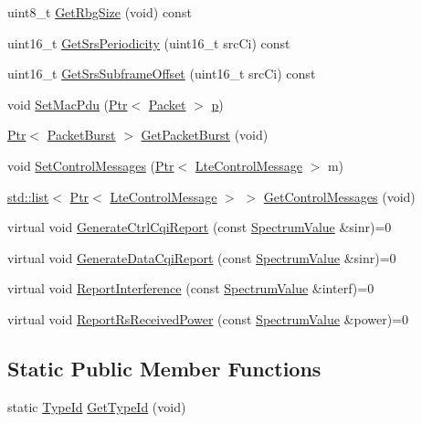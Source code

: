 \begin{DoxyCompactItemize}
uint8\+\_\+t \hyperlink{classns3_1_1LtePhy_a0b43cc13670b730fce0b55c8e0db60d9}{Get\+Rbg\+Size} (void) const 
\item 
uint16\+\_\+t \hyperlink{classns3_1_1LtePhy_af761a0bb48001fbc605757f781d5724d}{Get\+Srs\+Periodicity} (uint16\+\_\+t src\+Ci) const 
\item 
uint16\+\_\+t \hyperlink{classns3_1_1LtePhy_a384463481e12aa876837f3f12e2ce987}{Get\+Srs\+Subframe\+Offset} (uint16\+\_\+t src\+Ci) const 
\item 
void \hyperlink{classns3_1_1LtePhy_ab146e4e7513da96c3a8708e61c49b2b4}{Set\+Mac\+Pdu} (\hyperlink{classns3_1_1Ptr}{Ptr}$<$ \hyperlink{classns3_1_1Packet}{Packet} $>$ \hyperlink{lte__link__budget__x2__handover__measures_8m_ac9de518908a968428863f829398a4e62}{p})
\item 
\hyperlink{classns3_1_1Ptr}{Ptr}$<$ \hyperlink{classns3_1_1PacketBurst}{Packet\+Burst} $>$ \hyperlink{classns3_1_1LtePhy_a832e7a5c99c59e5ee23cbd6e748400e0}{Get\+Packet\+Burst} (void)
\item 
void \hyperlink{classns3_1_1LtePhy_ac9b58c16a19e12a336a0593b129d6932}{Set\+Control\+Messages} (\hyperlink{classns3_1_1Ptr}{Ptr}$<$ \hyperlink{classns3_1_1LteControlMessage}{Lte\+Control\+Message} $>$ m)
\item 
\hyperlink{openflow-interface_8h_afd9bcfa176617760671b67580f536fa7}{std\+::list}$<$ \hyperlink{classns3_1_1Ptr}{Ptr}$<$ \hyperlink{classns3_1_1LteControlMessage}{Lte\+Control\+Message} $>$ $>$ \hyperlink{classns3_1_1LtePhy_acd957b791ce9b6181b05add134061a67}{Get\+Control\+Messages} (void)
\item 
virtual void \hyperlink{classns3_1_1LtePhy_ad29fb53021d110925936ff862d788ec2}{Generate\+Ctrl\+Cqi\+Report} (const \hyperlink{classns3_1_1SpectrumValue}{Spectrum\+Value} \&sinr)=0
\item 
virtual void \hyperlink{classns3_1_1LtePhy_abc4ccbc830d4b855afffa9df205575f5}{Generate\+Data\+Cqi\+Report} (const \hyperlink{classns3_1_1SpectrumValue}{Spectrum\+Value} \&sinr)=0
\item 
virtual void \hyperlink{classns3_1_1LtePhy_a0258852be496119ceacf315dfbd9f201}{Report\+Interference} (const \hyperlink{classns3_1_1SpectrumValue}{Spectrum\+Value} \&interf)=0
\item 
virtual void \hyperlink{classns3_1_1LtePhy_a8553d13f4b71549dde4adbd00321984f}{Report\+Rs\+Received\+Power} (const \hyperlink{classns3_1_1SpectrumValue}{Spectrum\+Value} \&power)=0
\end{DoxyCompactItemize}
\subsection*{Static Public Member Functions}
\begin{DoxyCompactItemize}
\item 
static \hyperlink{classns3_1_1TypeId}{Type\+Id} \hyperlink{classns3_1_1LtePhy_a0229d01d4896d8ed6438c2366a79a2ff}{Get\+Type\+Id} (void)
\end{DoxyCompactItemize}
